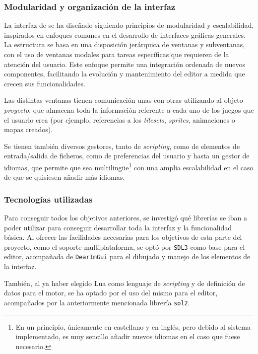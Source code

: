 \subsubsection{Modularidad y organización de la interfaz}
La interfaz de \baker se ha diseñado siguiendo principios de modularidad y escalabilidad, inspirados en enfoques comunes en el desarrollo de interfaces gráficas generales. La estructura se basa en una disposición jerárquica de ventanas y subventanas, con el uso de ventanas modales para tareas específicas que requieren de la atención del usuario. Este enfoque permite una integración ordenada de nuevos componentes, facilitando la evolución y mantenimiento del editor a medida que crecen sus funcionalidades.

\medskip

Las distintas ventanas tienen comunicación unas con otras utilizando al objeto \textit{proyecto}, que almacena toda la información referente a cada uno de los juegos que el usuario crea (por ejemplo, referencias a los \textit{tilesets}, \textit{sprites}, animaciones o mapas creados).

\smallskip

Se tienen también diversos gestores, tanto de \textit{scripting}, como de elementos de entrada/salida de ficheros, como de preferencias del usuario y hasta un gestor de idiomas, que permite que \baker{} sea multilingüe\footnote{En un principio, únicamente en castellano y en inglés, pero debido al sistema implementado, es muy sencillo añadir nuevos idiomas en el caso que fuese necesario.} con una amplia escalabilidad en el caso de que se quisiesen añadir más idiomas.

\subsubsection{Tecnologías utilizadas}

Para conseguir todos los objetivos anteriores, se investigó qué librerías se iban a poder utilizar para conseguir desarrollar toda la interfaz y la funcionalidad básica. Al ofrecer las facilidades necesarias para los objetivos de esta parte del proyecto, como el soporte multiplataforma, se optó por \texttt{SDL3} como base para el editor, acompañada de \texttt{DearImGui} para el dibujado y manejo de los elementos de la interfaz.

\medskip

También, al ya haber elegido Lua como lenguaje de \textit{scripting} y de definición de datos para el motor, se ha optado por el uso del mismo para el editor, acompañados por la anteriormente mencionada librería \texttt{sol2}.

